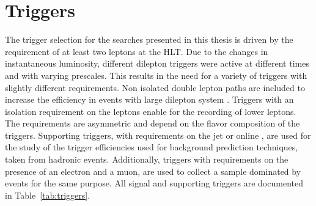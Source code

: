\section{Triggers}\label{sec:trigger}
\noindent\justify
The trigger selection for the searches presented in this thesis is driven by the requirement of at least two leptons at the HLT.
Due to the changes in instantaneous luminosity, different dilepton triggers were active at different times and with varying prescales. 
This results in the need for a variety of triggers with slightly different requirements.
Non isolated double lepton paths are included to increase the efficiency in events with large dilepton system \pt. 
Triggers with an isolation requirement on the leptons enable for the recording of lower \pt leptons. 
The \pt requirements are asymmetric and depend on the flavor composition of the triggers.
Supporting triggers, with requirements on the jet \HT or online \ptmiss, are used for the study of the trigger efficiencies used for background prediction techniques, taken from hadronic events. 
Additionally, triggers with requirements on the presence of an electron and a muon, are used to collect a sample dominated by \ttbar events for the same purpose.
All signal and supporting triggers are documented in Table~\ref{tab:triggers}.                                                                                                        

